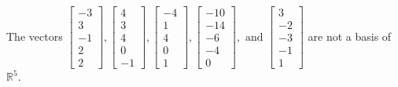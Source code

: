 \begin{exercise}
\begin{exerciseStatement}
  \end{exerciseStatement}
  \begin{exerciseAnswer}
   The vectors \(\left[\begin{array}{r}
-3 \\
3 \\
-1 \\
2 \\
2
\end{array}\right] , \left[\begin{array}{r}
4 \\
3 \\
4 \\
0 \\
-1
\end{array}\right] , \left[\begin{array}{r}
-4 \\
1 \\
4 \\
0 \\
1
\end{array}\right] , \left[\begin{array}{r}
-10 \\
-14 \\
-6 \\
-4 \\
0
\end{array}\right] , \text{ and } \left[\begin{array}{r}
3 \\
-2 \\
-3 \\
-1 \\
1
\end{array}\right]\) 
  	 are not  a basis of \(\mathbb{R}^5\).
  


  \end{exerciseAnswer}
\end{exercise}